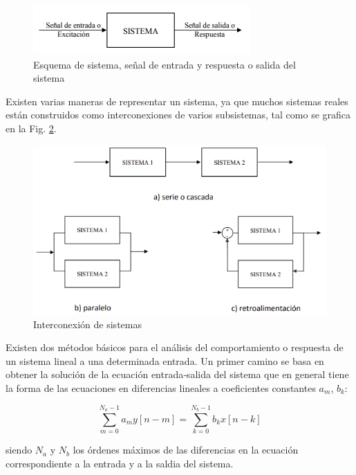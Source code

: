 \documentclass[conference]{IEEEtran}
\begin{document}
\begin{figure}[htbp]
\centering
\includegraphics[width=.9\linewidth]{../images/esquemaFiltro.png}
\caption{\label{fig:esquemaFiltro}Esquema de sistema, señal de entrada y respuesta o salida del sistema}
\end{figure}

Existen varias maneras de representar un sistema, ya que muchos sistemas reales están construidos como interconexiones de varios subsistemas, tal como se grafica en la Fig. \ref{fig:interconexionSistema}.

\begin{figure}[htbp]
\centering
\includegraphics[width=.9\linewidth]{../images/interconexionSistema.png}
\caption{\label{fig:interconexionSistema}Interconexión de sistemas}
\end{figure}

Existen dos métodos básicos para el análisis del comportamiento o respuesta de un sistema lineal a una determinada entrada. Un primer camino se basa en obtener la solución de la ecuación entrada‐salida del sistema que en general tiene la forma de las ecuaciones en diferencias lineales a coeficientes constantes \(a_{m}\), \(b_k\):

\begin{equation}
    \sum_{m=0}^{N_a - 1}{a_m y[n-m]} = \sum_{k=0}^{N_b - 1}{b_k x[n-k]}
    \label{eq:defFiltro}
\end{equation}

siendo \(N_a\) y \(N_b\) los órdenes máximos de las diferencias en la ecuación correspondiente a la entrada y a la saldia del sistema.
\end{document}
